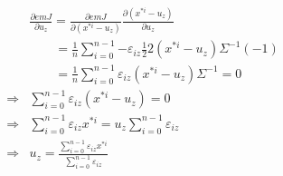 \documentclass[runningheads,openany]{xhlPaper}
\begin{document}
\begin{equation}
\label{equ:pmmGMMu}
\begin{aligned}
&\frac{{\partial emJ}}{{\partial {u_z}}} = \frac{{\partial emJ}}{{\partial \left( {{x^{*i}} - {u_z}} \right)}}\frac{{\partial \left( {{x^{*i}} - {u_z}} \right)}}{{\partial {u_z}}}\\
 &\quad\quad= \frac{1}{n}\sum\limits_{i = 0}^{n - 1} { - {\varepsilon _{iz}}\frac{1}{2}2\left( {{x^{*i}} - {u_z}} \right){\Sigma ^{ - 1}}} \left( { - 1} \right)\\
 &\quad\quad= \frac{1}{n}\sum\limits_{i = 0}^{n - 1} {{\varepsilon _{iz}}\left( {{x^{*i}} - {u_z}} \right)} {\Sigma ^{ - 1}} = 0\\
 \Rightarrow& \sum\limits_{i = 0}^{n - 1} {{\varepsilon _{iz}}\left( {{x^{*i}} - {u_z}} \right)}  = 0\\
 \Rightarrow& \sum\limits_{i = 0}^{n - 1} {{\varepsilon _{iz}}{x^{*i}}}  = {u_z}\sum\limits_{i = 0}^{n - 1} {{\varepsilon _{iz}}}\\
 \Rightarrow& {u_z} = \frac{{\sum\limits_{i = 0}^{n - 1} {{\varepsilon _{iz}}{x^{*i}}} }}{{\sum\limits_{i = 0}^{n - 1} {{\varepsilon _{iz}}} }}
\end{aligned}
\end{equation}
\end{document}
